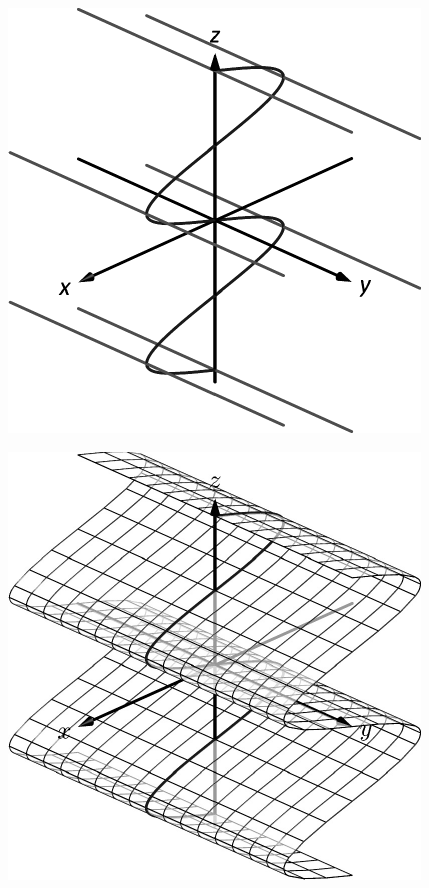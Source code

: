 \documentclass[10pt]{article}
\begin{document}
\includegraphics{figspace4e_3DBW.pdf}
\texttt{}

\includegraphics{figspace4f_3DBW.pdf}
\texttt{}
\end{document}
